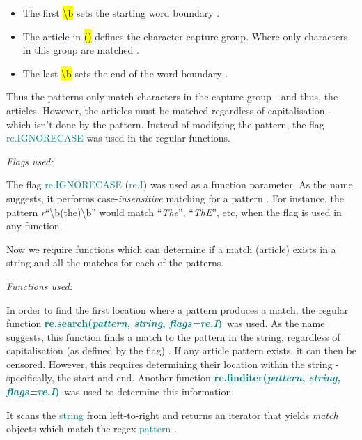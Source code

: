 \documentclass[a4paper]{article}
\newcommand \search {\textcolor{teal}{\textbf{re.search(\emph{pattern}, \emph{string}, \emph{flags=re.I})}}}
\newcommand \finditer {\textcolor{teal}{\textbf{re.finditer(\emph{pattern}, \emph{string}, \emph{flags=re.I})}}}
\begin{document}
\begin{itemize}
    \item The first \hl{\textbackslash b} sets the starting word boundary \autocite{a2022_re}.
    \item The article in \hl{()} defines the character capture group. Where only characters in this group are matched \autocite{a2022_re}.
    \item The last \hl{\textbackslash b} sets the end of the word boundary \autocite{a2022_re}.
\end{itemize}
Thus the patterns only match characters in the capture group - and thus, the articles. However, the articles must be matched regardless of capitalisation - which isn't done by the pattern. Instead of modifying the pattern, the flag \textcolor{teal}{re.IGNORECASE} was used in the regular functions.
\vspace{5mm}


\noindent
\emph{Flags used:}
\vspace{2mm}

\noindent
The flag \textcolor{teal}{re.IGNORECASE} (\textcolor{teal}{re.I}) was used as a function parameter. As the name suggests, it performs case-\emph{insensitive} matching for a pattern \autocite{a2022_re}. For instance, the pattern \emph{r}\enquote{\textbackslash b(the)\textbackslash b} would match \enquote{\emph{The}}, \enquote{\emph{ThE}}, etc, when the flag is used in any function.

Now we require functions which can determine if a match (article) exists in a string and all the matches for each of the patterns.
\vspace{5mm}

\noindent
\emph{Functions used:}
\vspace{2mm}

\noindent
In order to find the first location where a pattern produces a match, the regular function \search \ was used. As the name suggests, this function finds a match to the pattern in the string, regardless of capitalisation (as defined by the flag) \autocite{a2022_re}. If any article pattern exists, it can then be censored. However, this requires determining their location within the string - specifically, the start and end. Another function \finditer \ was used to determine this information.

It scans the \textcolor{teal}{string} from left-to-right and returns an iterator that yields \emph{match} objects which match the regex \textcolor{teal}{pattern} \autocite{a2022_re}.
\end{document}
